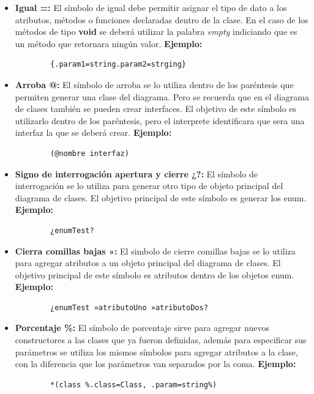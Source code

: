 \begin{itemize}
	\item \textbf{Igual =:} El símbolo de igual debe permitir asignar el tipo de dato a los atributos, métodos o funciones declaradas dentro de la clase. En el caso de los métodos de tipo \textbf{void}  se deberá utilizar la palabra \textit{empty} indiciando que es un método que retornara ningún valor. \textbf{Ejemplo:}
	
	\begin{verbatim}
		{.param1=string.param2=strging}
	\end{verbatim}
	
	\item \textbf{Arroba @:} El símbolo de arroba se lo utiliza dentro de los paréntesis que permiten generar una clase del diagrama. Pero se recuerda que en el diagrama de clases también se pueden crear interfaces. El objetivo de este símbolo es utilizarlo dentro de los paréntesis, pero el interprete identificara que sera una interfaz la que se deberá crear. \textbf{Ejemplo:}
	  
	\begin{verbatim}
		(@nombre interfaz)
	\end{verbatim}

	\item  \textbf{Signo de interrogación apertura y cierre ¿?:} El símbolo de interrogación se lo utiliza para generar otro tipo de objeto principal del diagrama de clases. El objetivo principal de este símbolo es generar los enum. \textbf{Ejemplo:}
	
	\begin{verbatim}
		¿enumTest?
	\end{verbatim}

	\item \textbf{Cierra comillas bajas »:} El simbolo de cierre comillas bajas se lo utiliza para agregar atributos a un objeto principal del diagrama de clases. El objetivo principal de este símbolo es atributos dentro de los objetos enum. \textbf{Ejemplo:}
	
	\begin{verbatim}
		¿enumTest »atributoUno »atributoDos?
	\end{verbatim}

	\item \textbf{Porcentaje \%:} El símbolo de porcentaje sirve para agregar nuevos constructores a las clases que ya fueron definidas, además para especificar sus parámetros se utiliza los mismos símbolos para agregar atributos a la clase, con la diferencia que los parámetros van separados por la coma. \textbf{Ejemplo:}
	
	\begin{verbatim}
		*(class %.class=Class, .param=string%)
	\end{verbatim}
	  
\end{itemize}

